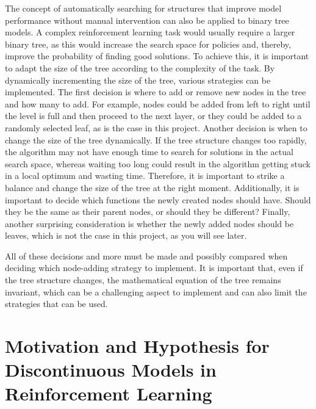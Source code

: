 The concept of automatically searching for structures that improve model performance without manual intervention can also be applied to binary tree models. A complex reinforcement learning task would usually require a larger binary tree, as this would increase the search space for policies and, thereby, improve the probability of finding good solutions. To achieve this, it is important to adapt the size of the tree according to the complexity of the task. By dynamically incrementing the size of the tree, various strategies can be implemented. The first decision is where to add or remove new nodes in the tree and how many to add. For example, nodes could be added from left to right until the level is full and then proceed to the next layer, or they could be added to a randomly selected leaf, as is the case in this project. Another decision is when to change the size of the tree dynamically. If the tree structure changes too rapidly, the algorithm may not have enough time to search for solutions in the actual search space, whereas waiting too long could result in the algorithm getting stuck in a local optimum and wasting time. Therefore, it is important to strike a balance and change the size of the tree at the right moment. Additionally, it is important to decide which functions the newly created nodes should have. Should they be the same as their parent nodes, or should they be different? Finally, another surprising consideration is whether the newly added nodes should be leaves, which is not the case in this project, as you will see later.

All of these decisions and more must be made and possibly compared when deciding which node-adding strategy to implement. It is important that, even if the tree structure changes, the mathematical equation of the tree remains invariant, which can be a challenging aspect to implement and can also limit the strategies that can be used.


\section{Motivation and Hypothesis for Discontinuous Models in Reinforcement Learning}

